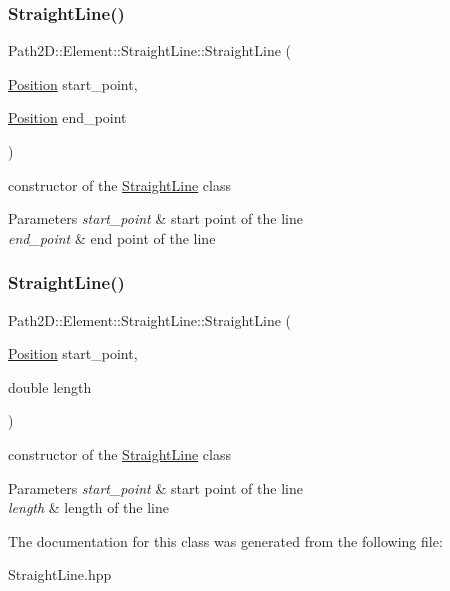 \subsubsection{\texorpdfstring{Straight\+Line()}{StraightLine()}\hspace{0.1cm}{\footnotesize\ttfamily [1/2]}}
{\footnotesize\ttfamily Path2\+D\+::\+Element\+::\+Straight\+Line\+::\+Straight\+Line (\begin{DoxyParamCaption}\item[{\mbox{\hyperlink{class_path2_d_1_1_element_1_1_position}{Position}}}]{start\+\_\+point,  }\item[{\mbox{\hyperlink{class_path2_d_1_1_element_1_1_position}{Position}}}]{end\+\_\+point }\end{DoxyParamCaption})}



constructor of the \mbox{\hyperlink{class_path2_d_1_1_element_1_1_straight_line}{Straight\+Line}} class 


\begin{DoxyParams}{Parameters}
{\em start\+\_\+point} & start point of the line \\
\hline
{\em end\+\_\+point} & end point of the line \\
\hline
\end{DoxyParams}
\mbox{\label{class_path2_d_1_1_element_1_1_straight_line_a618128b2e4005f9671d55165ddc114de}} 
\subsubsection{\texorpdfstring{Straight\+Line()}{StraightLine()}\hspace{0.1cm}{\footnotesize\ttfamily [2/2]}}
{\footnotesize\ttfamily Path2\+D\+::\+Element\+::\+Straight\+Line\+::\+Straight\+Line (\begin{DoxyParamCaption}\item[{\mbox{\hyperlink{class_path2_d_1_1_element_1_1_position}{Position}}}]{start\+\_\+point,  }\item[{double}]{length }\end{DoxyParamCaption})}



constructor of the \mbox{\hyperlink{class_path2_d_1_1_element_1_1_straight_line}{Straight\+Line}} class 


\begin{DoxyParams}{Parameters}
{\em start\+\_\+point} & start point of the line \\
\hline
{\em length} & length of the line \\
\hline
\end{DoxyParams}


The documentation for this class was generated from the following file\+:\begin{DoxyCompactItemize}
\item 
Straight\+Line.\+hpp\end{DoxyCompactItemize}
